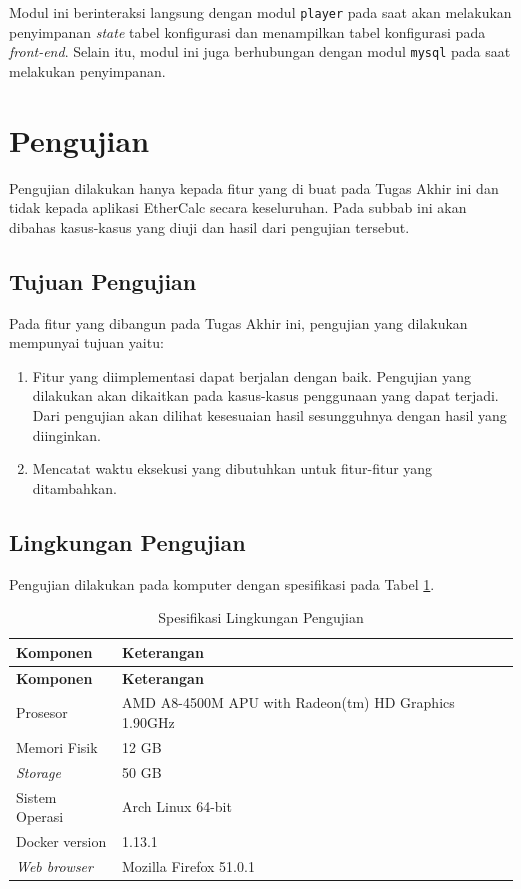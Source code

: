 	Modul ini berinteraksi langsung dengan modul \texttt{player} pada saat akan melakukan penyimpanan \textit{state} tabel konfigurasi dan menampilkan tabel konfigurasi pada \textit{front-end}. Selain itu, modul ini juga berhubungan dengan modul \texttt{mysql} pada saat melakukan penyimpanan.

\section{Pengujian}
Pengujian dilakukan hanya kepada fitur yang di buat pada Tugas Akhir ini dan tidak kepada aplikasi EtherCalc secara keseluruhan. Pada subbab ini akan dibahas kasus-kasus yang diuji dan hasil dari pengujian tersebut.

	\subsection{Tujuan Pengujian}
	Pada fitur yang dibangun pada Tugas Akhir ini, pengujian yang dilakukan mempunyai tujuan yaitu:
	\begin{enumerate}
		\item Fitur yang diimplementasi dapat berjalan dengan baik. Pengujian yang dilakukan akan dikaitkan pada kasus-kasus penggunaan yang dapat terjadi. Dari pengujian akan dilihat kesesuaian hasil sesungguhnya dengan hasil yang diinginkan.
		\item Mencatat waktu eksekusi yang dibutuhkan untuk fitur-fitur yang ditambahkan.
	\end{enumerate}

	\subsection{Lingkungan Pengujian}
	Pengujian dilakukan pada komputer dengan spesifikasi pada Tabel \ref{LingPengujian}.

	\begin{small}
	\begin{longtable}{ | p{3cm} | p{9cm} | }
	    \caption{Spesifikasi Lingkungan Pengujian}
	    \label{LingPengujian}\\ \hline
	    \centering\bfseries{Komponen} & \centering\bfseries{Keterangan} \tabularnewline \hline
	    \endfirsthead
	    \hline
	    \centering\bfseries{Komponen} & \centering\bfseries{Keterangan} \tabularnewline \hline
	    \endhead
		Prosesor & AMD A8-4500M APU with Radeon(tm) HD Graphics 1.90GHz\\ \hline
		Memori Fisik & 12 GB\\ \hline
		\textit{Storage} & 50 GB\\ \hline
		Sistem Operasi & Arch Linux 64-bit\\ \hline
		Docker version & 1.13.1\\ \hline
		\textit{Web browser} & Mozilla Firefox 51.0.1\\ \hline
	\end{longtable}
	\end{small}

